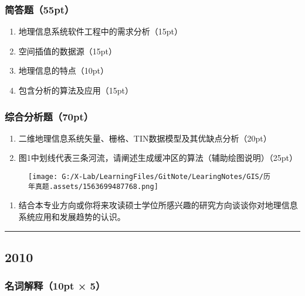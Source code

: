 \documentclass[]{article}
\begin{document}
\hypertarget{header-n335}{%
\subsubsection{简答题（55pt）}\label{header-n335}}

\begin{enumerate}
\def\labelenumi{\arabic{enumi}.}
\item
  地理信息系统软件工程中的需求分析（15pt）
\item
  空间插值的数据源（15pt）
\item
  地理信息的特点（10pt）
\item
  包含分析的算法及应用（15pt）
\end{enumerate}

\hypertarget{header-n345}{%
\subsubsection{综合分析题（70pt）}\label{header-n345}}

\begin{enumerate}
\def\labelenumi{\arabic{enumi}.}
\item
  二维地理信息系统矢量、栅格、TIN数据模型及其优缺点分析（20pt）
\item
  图1中划线代表三条河流，请阐述生成缓冲区的算法（辅助绘图说明）（25pt）
\end{enumerate}

\begin{figure}
\centering
\texttt{[image: G:/X-Lab/LearningFiles/GitNote/LearingNotes/GIS/历年真题.assets/1563699487768.png]}
\caption{}
\end{figure}

\begin{enumerate}
\def\labelenumi{\arabic{enumi}.}
\item
  结合本专业方向或你将来攻读硕士学位所感兴趣的研究方向谈谈你对地理信息系统应用和发展趋势的认识。
\end{enumerate}

\begin{center}\rule{0.5\linewidth}{\linethickness}\end{center}

\hypertarget{header-n356}{%
\subsection{2010}\label{header-n356}}

\hypertarget{header-n357}{%
\subsubsection{名词解释（10pt × 5）}\label{header-n357}}
\end{document}
